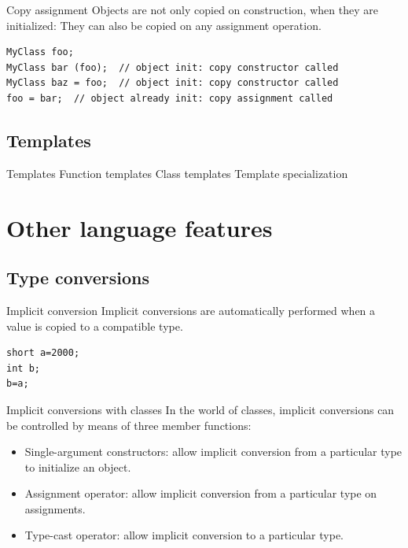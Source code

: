 \documentclass{beamer}
\begin{document}
\begin{frame}[fragile]{Copy assignment}
Objects are not only copied on construction, when they are initialized: They can
also be copied on any assignment operation.
\begin{lstlisting}
MyClass foo;
MyClass bar (foo);  // object init: copy constructor called
MyClass baz = foo;  // object init: copy constructor called
foo = bar;  // object already init: copy assignment called
\end{lstlisting}
\end{frame}

\subsection{Templates}

\begin{frame}{Templates}
Function templates
Class templates
Template specialization
\end{frame}

\section{Other language features}
\subsection{Type conversions}
\begin{frame}[fragile]{Implicit conversion}
Implicit conversions are automatically performed when a value is copied to a
compatible type.
\begin{lstlisting}
short a=2000;
int b;
b=a;
\end{lstlisting}
\end{frame}

\begin{frame}{Implicit conversions with classes}
In the world of classes, implicit conversions can be controlled by means of three member functions:
\begin{itemize}
  \item Single-argument constructors: allow implicit conversion from a
  particular type to initialize an object.
  \item Assignment operator: allow implicit conversion from a particular type on
  assignments.
  \item Type-cast operator: allow implicit conversion to a particular type.
\end{itemize}
\end{frame}
\end{document}
